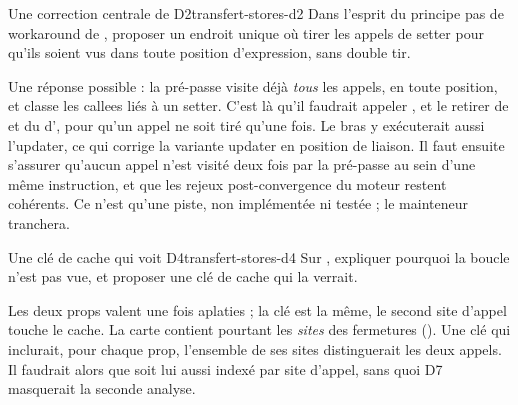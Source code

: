 \begin{exercice}{Une correction centrale de D2}{transfert-stores-d2}
  Dans l'esprit du principe \og pas de workaround\fg{} de ,
  proposer un endroit unique où tirer les appels de setter pour qu'ils
  soient vus dans toute position d'expression, sans double tir.
\end{exercice}
\begin{solution}
  Une réponse possible : la pré-passe visite déjà \emph{tous} les appels, en
  toute position, et classe  les callees liés à un setter. C'est
  là qu'il faudrait appeler , et le retirer de
   et du  d', pour
  qu'un appel ne soit tiré qu'une fois. Le bras  y exécuterait
  aussi l'updater, ce qui corrige la variante \og updater en position de
  liaison\fg{}. Il faut ensuite s'assurer qu'aucun appel n'est visité deux
  fois par la pré-passe au sein d'une même instruction, et que les rejeux
  post-convergence du moteur restent cohérents. Ce n'est qu'une piste, non
  implémentée ni testée ; le mainteneur tranchera.
\end{solution}

\begin{exercice}{Une clé de cache qui voit D4}{transfert-stores-d4}
  Sur , expliquer pourquoi la boucle n'est pas vue,
  et proposer une clé de cache qui la verrait.
\end{exercice}
\begin{solution}
  Les deux props  valent  une fois
  aplaties ; la clé est la même, le second site d'appel touche le cache.
  La carte  contient pourtant les \emph{sites} des
  fermetures (). Une clé qui inclurait, pour chaque prop,
  l'ensemble de ses sites distinguerait les deux appels. Il faudrait alors
  que  soit lui aussi indexé par site d'appel, sans quoi D7
  masquerait la seconde analyse.
\end{solution}

